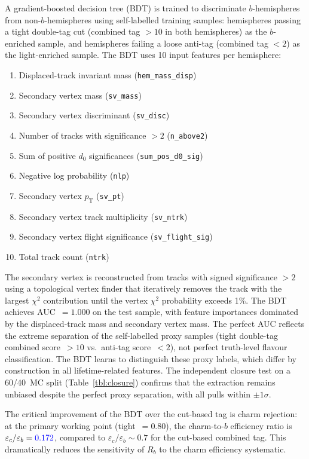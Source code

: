\documentclass[11pt,a4paper]{article}
\newcommand{\measured}[1]{\textcolor{blue}{#1}}
\begin{document}
A gradient-boosted decision tree (BDT) is trained to discriminate
$b$-hemispheres from non-$b$-hemispheres using self-labelled training
samples: hemispheres passing a tight double-tag cut (combined tag $> 10$
in both hemispheres) as the $b$-enriched sample, and hemispheres failing
a loose anti-tag (combined tag $< 2$) as the light-enriched sample.
The BDT uses 10 input features per hemisphere:

\begin{enumerate}
\item Displaced-track invariant mass (\texttt{hem\_mass\_disp})
\item Secondary vertex mass (\texttt{sv\_mass})
\item Secondary vertex discriminant (\texttt{sv\_disc})
\item Number of tracks with significance $> 2$ (\texttt{n\_above2})
\item Sum of positive $d_0$ significances (\texttt{sum\_pos\_d0\_sig})
\item Negative log probability (\texttt{nlp})
\item Secondary vertex $p_\mathrm{T}$ (\texttt{sv\_pt})
\item Secondary vertex track multiplicity (\texttt{sv\_ntrk})
\item Secondary vertex flight significance (\texttt{sv\_flight\_sig})
\item Total track count (\texttt{ntrk})
\end{enumerate}

The secondary vertex is reconstructed from tracks with signed significance
$> 2$ using a topological vertex finder that iteratively removes the
track with the largest $\chi^2$ contribution until the vertex $\chi^2$
probability exceeds 1\%.  The BDT achieves AUC~$= 1.000$ on the test
sample, with feature importances dominated by the displaced-track mass
and secondary vertex mass.  The perfect AUC reflects the extreme
separation of the self-labelled proxy samples (tight double-tag
combined score~$> 10$ vs.\ anti-tag score~$< 2$), not perfect
truth-level flavour classification.  The BDT learns to distinguish
these proxy labels, which differ by construction in all lifetime-related
features.  The independent closure test on a 60/40~MC split (Table~\ref{tbl:closure})
confirms that the extraction remains unbiased despite the
perfect proxy separation, with all pulls within $\pm 1\sigma$.

The critical improvement of the BDT over the cut-based tag is charm
rejection: at the primary working point (tight~$= 0.80$), the charm-to-$b$
efficiency ratio is $\varepsilon_c / \varepsilon_b = \measured{0.172}$,
compared to $\varepsilon_c / \varepsilon_b \sim 0.7$ for the cut-based
combined tag.  This dramatically reduces the sensitivity of $R_b$ to
the charm efficiency systematic.
\end{document}
